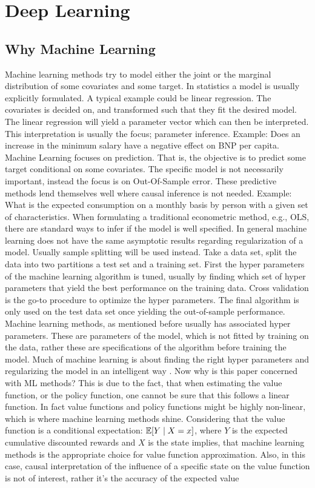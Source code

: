 \section{Deep Learning}
\label{sec:deep_learning}


\subsection{Why Machine Learning}

Machine learning methods try to model either the joint or the marginal distribution of some covariates and some target. In statistics a model is usually explicitly formulated. A typical example could be linear regression. The covariates is decided on, and transformed such that they fit the desired model. The linear regression will yield a parameter vector which can then be interpreted. This interpretation is usually the focus; parameter inference. Example: Does an increase in the minimum salary have a negative effect on BNP per capita. Machine Learning focuses on prediction. That is, the objective is to predict some target conditional on some covariates. The specific model is not necessarily important, instead the focus is on Out-Of-Sample error. These predictive methods lend themselves well where causal inference is not needed. Example: What is the expected consumption on a monthly basis by person with a given set of characteristics. When formulating a traditional econometric method, e.g., OLS, there are standard ways to infer if the model is well specified. In general machine learning does not have the same asymptotic results regarding regularization of a model. Usually sample splitting will be used instead. Take a data set, split the data into two partitions a test set and a training set. First the hyper parameters of the machine learning algorithm is tuned, usually by finding which set of hyper parameters that yield the best performance on the training data. Cross validation is the go-to procedure to optimize the hyper parameters. The final algorithm is only used on the test data set once yielding the out-of-sample performance. Machine learning methods, as mentioned before usually has associated hyper parameters. These are parameters of the model, which is not fitted by training on the data, rather these are specifications of the algorithm before training the model. Much of machine learning is about finding the right hyper parameters and regularizing the model in an intelligent way \parencite{friedman_elements_2001}. Now why is this paper concerned with ML methods? This is due to the fact, that when estimating the value function, or the policy function, one cannot be sure that this follows a linear function. In fact value functions and policy functions might be highly non-linear, which is where machine learning methods shine. Considering that the value function is a conditional expectation: $ \mathbb{E}[Y \mid X=x]$, where $Y$ is the expected cumulative discounted rewards and $X$ is the state implies, that machine learning methods is the appropriate choice for value function approximation. Also, in this case, causal interpretation of the influence of a specific state on the value function is not of interest, rather it's the accuracy of the expected value 